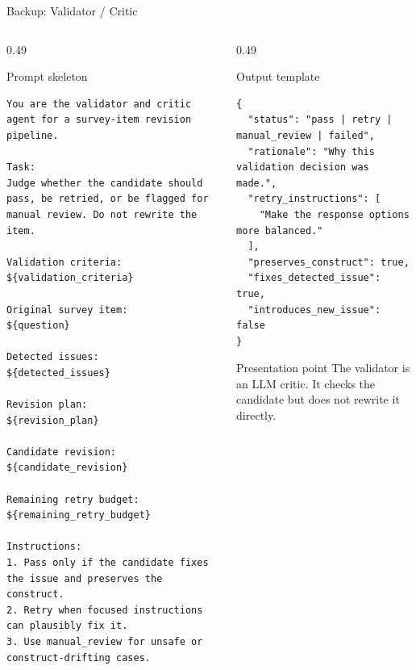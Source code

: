 \documentclass[aspectratio=169]{beamer}
\begin{document}
\begin{frame}[fragile]{Backup: Validator / Critic}
  \begin{columns}[T]
    \begin{column}{0.49\textwidth}
      \begin{block}{Prompt skeleton}
\begin{lstlisting}
You are the validator and critic agent for a survey-item revision pipeline.

Task:
Judge whether the candidate should pass, be retried, or be flagged for manual review. Do not rewrite the item.

Validation criteria:
${validation_criteria}

Original survey item:
${question}

Detected issues:
${detected_issues}

Revision plan:
${revision_plan}

Candidate revision:
${candidate_revision}

Remaining retry budget:
${remaining_retry_budget}

Instructions:
1. Pass only if the candidate fixes the issue and preserves the construct.
2. Retry when focused instructions can plausibly fix it.
3. Use manual_review for unsafe or construct-drifting cases.
\end{lstlisting}
      \end{block}
    \end{column}
    \begin{column}{0.49\textwidth}
      \begin{block}{Output template}
\begin{lstlisting}
{
  "status": "pass | retry | manual_review | failed",
  "rationale": "Why this validation decision was made.",
  "retry_instructions": [
    "Make the response options more balanced."
  ],
  "preserves_construct": true,
  "fixes_detected_issue": true,
  "introduces_new_issue": false
}
\end{lstlisting}
      \end{block}

      \begin{alertblock}{Presentation point}
        The validator is an LLM critic. It checks the candidate but does not rewrite it directly.
      \end{alertblock}
    \end{column}
  \end{columns}
\end{frame}
\end{document}
